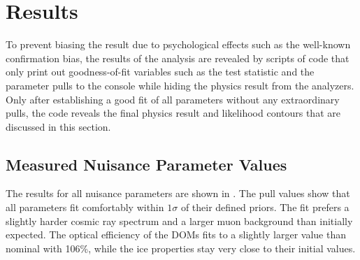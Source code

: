 \section{Results}

To prevent biasing the result due to psychological effects such as the well-known confirmation bias, the results of the analysis are revealed by scripts of code that only print out goodness-of-fit variables such as the test statistic and the parameter pulls to the console while hiding the physics result from the analyzers.
Only after  establishing a good fit of all parameters without any extraordinary pulls, the code reveals the final physics result and likelihood contours that are discussed in this section.

\subsection{Measured Nuisance Parameter Values}
The results for all nuisance parameters are shown in .
The pull values show that all parameters fit comfortably within $1\sigma$ of their defined priors.
The fit prefers a slightly harder cosmic ray spectrum and a larger muon background than initially expected.
The optical efficiency of the DOMs fits to a slightly larger value than nominal with 106\%, while the ice properties stay very close to their initial values.


